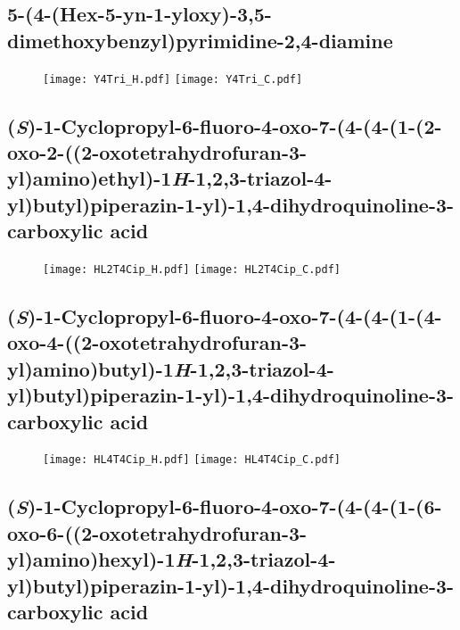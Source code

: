 
\subsection{5-(4-(Hex-5-yn-1-yloxy)-3,5-dimethoxybenzyl)pyrimidine-2,4-diamine }

\begin{figure}[H]
	\centering
		\texttt{[image: Y4Tri\_H.pdf]}
		\texttt{[image: Y4Tri\_C.pdf]}
\end{figure}

\subsection{(\textit{S})-1-Cyclopropyl-6-fluoro-4-oxo-7-(4-(4-(1-(2-oxo-2-((2-oxotetrahydrofuran-3-yl)amino)ethyl)-1\textit{H}-1,2,3-triazol-4-yl)butyl)piperazin-1-yl)-1,4-dihydroquinoline-3-carboxylic acid }

\begin{figure}[H]
	\centering
		\texttt{[image: HL2T4Cip\_H.pdf]}
		\texttt{[image: HL2T4Cip\_C.pdf]}
\end{figure}

\subsection{(\textit{S})-1-Cyclopropyl-6-fluoro-4-oxo-7-(4-(4-(1-(4-oxo-4-((2-oxotetrahydrofuran-3-yl)amino)butyl)-1\textit{H}-1,2,3-triazol-4-yl)butyl)piperazin-1-yl)-1,4-dihydroquinoline-3-carboxylic acid }

\begin{figure}[H]
	\centering
		\texttt{[image: HL4T4Cip\_H.pdf]}
		\texttt{[image: HL4T4Cip\_C.pdf]}
\end{figure}

\subsection{(\textit{S})-1-Cyclopropyl-6-fluoro-4-oxo-7-(4-(4-(1-(6-oxo-6-((2-oxotetrahydrofuran-3-yl)amino)hexyl)-1\textit{H}-1,2,3-triazol-4-yl)butyl)piperazin-1-yl)-1,4-dihydroquinoline-3-carboxylic acid }

